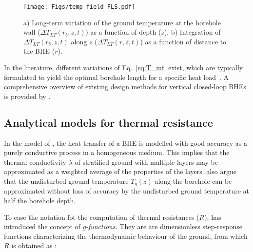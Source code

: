 \begin{figure}
    \centering
    \texttt{[image: Figs/temp\_field\_FLS.pdf]}
    \begin{subfigure}[t]{.42\textwidth}
        \centering
    \subcaption{}
      \label{figa:T_field}
    \end{subfigure}
    \begin{subfigure}[t]{.45\textwidth}
      \centering
        \subcaption{}
      \label{figb:T_field}
    \end{subfigure}
    \caption{a) Long-term variation of the ground temperature at the borehole wall ($\Delta T_{LT}(r_b, z, t)$) as a function of depth ($z$), b) Integration of $\Delta T_{LT}(r_b, z, t)$ along $z$ ($\Delta T_{LT}(r, \overline{z}, t)$) as a function of distance to the BHE ($r$).}
    \label{fig:T_field}
\end{figure}

In the literature, different variations of Eq.~\ref{eq:T_mf} exist, which are typically formulated to yield the optimal borehole length for a specific heat load~\cite{kavanaugh_geothermal_2014,sia_sondes_2010}. 
A comprehensive overview of existing design methods for vertical closed-loop BHEs is provided by \citet{spitler_vertical_2016}.

\subsection{Analytical models for thermal resistance}
\label{geo_models}
\label{app:models}

In the model of \citet{claesson_conductive_1988}, the heat transfer of a BHE is modelled with good accuracy as a purely conductive process in a homogeneous medium.
This implies that the thermal conductivity $\lambda$ of stratified ground with multiple layers may be approximated as a weighted average of the properties of the layers. 
\citet{claesson_conductive_1988} also argue that the undisturbed ground temperature $T_g(z)$ along the borehole can be approximated without loss of accuracy by the undisturbed ground temperature at half the borehole depth. 

To ease the notation fot the computation of thermal resistances ($R$), \citet{eskilson_thermal_1987} has introduced the concept of \textit{g-functions}. They are are dimensionless step-response functions characterizing the thermodynamic behaviour of the ground, from which $R$ is obtained as \cite{eskilson_thermal_1987}:

